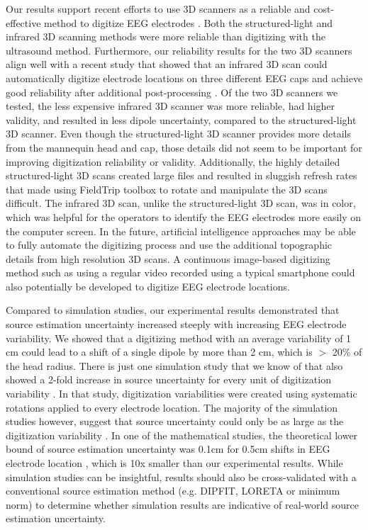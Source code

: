\documentclass{UCF_ETD}
\renewcommand{\ul}{}
\begin{document}
\ul{Our results support recent efforts to use 3D scanners as a reliable and cost-effective method to digitize EEG electrodes \citep{Taberna2019-zv,Chen2019-sc, Homolle2019-pd}.} Both the structured-light and infrared 3D scanning methods were more reliable than digitizing with the ultrasound method. Furthermore, our reliability results for the two 3D scanners align well with a recent study that showed that an infrared 3D scan could automatically digitize electrode locations on three different EEG caps and achieve good reliability after additional post-processing \citep{Taberna2019-zv}. Of the two 3D scanners we tested, the less expensive infrared 3D scanner was more reliable, had higher validity, and resulted in less dipole uncertainty, compared to the structured-light 3D scanner. Even though the structured-light 3D scanner provides more details from the mannequin head and cap, those details did not seem to be important for improving digitization reliability or validity. Additionally, the highly detailed structured-light 3D scans created large files and resulted in sluggish refresh rates that made \ul{using FieldTrip toolbox to rotate and manipulate the 3D scans difficult}. The infrared 3D scan, unlike the structured-light 3D scan, was in color, which was helpful for the operators to identify the EEG electrodes more easily on the computer screen. In the future, artificial intelligence approaches may be able to fully automate the digitizing process and use the additional topographic details from high resolution 3D scans. A continuous image-based digitizing method such as using a regular video recorded using a typical smartphone could also potentially be developed to digitize EEG electrode locations. 

Compared to simulation studies, our experimental results demonstrated that source estimation uncertainty increased steeply with increasing EEG electrode variability. We showed that a digitizing method with an average variability of 1 cm could lead to a shift of a single dipole by more than 2 cm, which is $>$ 20\% of the head radius. There is just one simulation study that we know of that also showed a 2-fold increase in source uncertainty for every unit of digitization variability \citep{Akalin_Acar2013-rv}. In that study, digitization variabilities were created using systematic rotations applied to every electrode location. The majority of the simulation studies however, suggest that source uncertainty could only be as large as the digitization variability \citep{Khosla1999-bz,Van_Hoey2000-jt,Wang2001-fp,Beltrachini2011-je}. In one of the mathematical studies, the theoretical lower bound of source estimation uncertainty was 0.1cm for 0.5cm shifts in EEG electrode location \citep{Beltrachini2011-je}, which is 10x smaller than our experimental results. While simulation studies can be insightful, results should also be cross-validated with a conventional source estimation method (e.g. DIPFIT, LORETA or minimum norm) to determine whether simulation results are indicative of real-world source estimation uncertainty.
\end{document}
